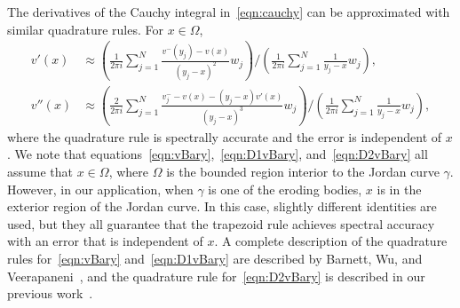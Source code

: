 \documentclass[3p]{elsarticle}
\newcommand{\RR}{{\mathbb{R}}}
\begin{document}
The derivatives of the Cauchy integral in~\eqref{eqn:cauchy} can be
approximated with similar quadrature rules. For $x \in \Omega$, 
\begin{align}
  v'(x) &\approx \left(\frac{1}{2\pi i}\sum_{j=1}^{N}
    \frac{v^{-}(y_j) - v(x)}{(y_j-x)^2} w_j \right)
  \Bigg/
  \left(\frac{1}{2\pi i}\sum_{j=1}^{N} \frac{1}{y_j-x} w_j\right), 
  \label{eqn:D1vBary} \\
  v''(x) &\approx \left(\frac{2}{2\pi i}\sum_{j=1}^N 
    \frac{v^{-}_{j} - v(x) - (y_j-x)v'(x)}{(y_j-x)^3}w_j \right)
    \Bigg/
    \left(\frac{1}{2\pi i}\sum_{j=1}^N \frac{1}{y_j-x}w_j\right),
  \label{eqn:D2vBary}
\end{align}
where the quadrature rule is spectrally accurate and the error is
independent of $x$. We note that
equations~\eqref{eqn:vBary},~\eqref{eqn:D1vBary},
and~\eqref{eqn:D2vBary} all assume that $x \in \Omega$, where $\Omega$
is the bounded region interior to the Jordan curve $\gamma$. However, in
our application, when $\gamma$ is one of the eroding bodies, $x$ is in
the exterior region of the Jordan curve. In this case, slightly
different identities are used, but they all guarantee that the trapezoid
rule achieves spectral accuracy with an error that is independent of
$x$. A complete description of the quadrature rules
for~\eqref{eqn:vBary} and~\eqref{eqn:D1vBary} are described by Barnett,
Wu, and Veerapaneni~\cite{bar-wu-vee2015}, and the quadrature rule
for~\eqref{eqn:D2vBary} is described in our previous
work~\cite{chiu2020viscous}.



\end{document}
